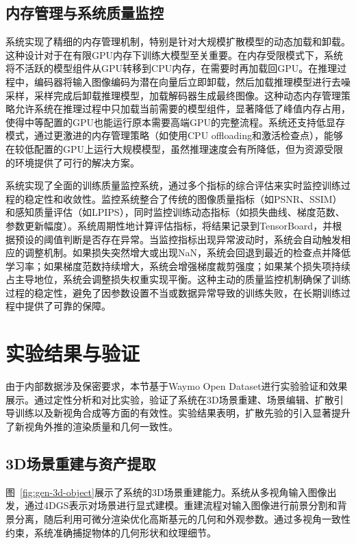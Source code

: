 \subsection{内存管理与系统质量监控}

系统实现了精细的内存管理机制，特别是针对大规模扩散模型的动态加载和卸载。这种设计对于在有限GPU内存下训练大模型至关重要。在内存受限模式下，系统将不活跃的模型组件从GPU转移到CPU内存，在需要时再加载回GPU。在推理过程中，编码器将输入图像编码为潜在向量后立即卸载，然后加载推理模型进行去噪采样，采样完成后卸载推理模型，加载解码器生成最终图像。这种动态内存管理策略允许系统在推理过程中只加载当前需要的模型组件，显著降低了峰值内存占用，使得中等配置的GPU也能运行原本需要高端GPU的完整流程。系统还支持低显存模式，通过更激进的内存管理策略（如使用CPU offloading和激活检查点），能够在较低配置的GPU上运行大规模模型，虽然推理速度会有所降低，但为资源受限的环境提供了可行的解决方案。

系统实现了全面的训练质量监控系统，通过多个指标的综合评估来实时监控训练过程的稳定性和收敛性。监控系统整合了传统的图像质量指标（如PSNR、SSIM）和感知质量评估（如LPIPS），同时监控训练动态指标（如损失曲线、梯度范数、参数更新幅度）。系统周期性地计算评估指标，将结果记录到TensorBoard，并根据预设的阈值判断是否存在异常。当监控指标出现异常波动时，系统会自动触发相应的调整机制。如果损失突然增大或出现NaN，系统会回退到最近的检查点并降低学习率；如果梯度范数持续增大，系统会增强梯度裁剪强度；如果某个损失项持续占主导地位，系统会调整损失权重实现平衡。这种主动的质量监控机制确保了训练过程的稳定性，避免了因参数设置不当或数据异常导致的训练失败，在长期训练过程中提供了可靠的保障。

\section{实验结果与验证}

由于内部数据涉及保密要求，本节基于Waymo Open Dataset进行实验验证和效果展示。通过定性分析和对比实验，验证了系统在3D场景重建、场景编辑、扩散引导训练以及新视角合成等方面的有效性。实验结果表明，扩散先验的引入显著提升了新视角外推的渲染质量和几何一致性。

\subsection{3D场景重建与资产提取}

图~\ref{fig:gen-3d-object}展示了系统的3D场景重建能力。系统从多视角输入图像出发，通过4DGS表示对场景进行显式建模。重建流程对输入图像进行前景分割和背景分离，随后利用可微分渲染优化高斯基元的几何和外观参数。通过多视角一致性约束，系统准确捕捉物体的几何形状和纹理细节。

